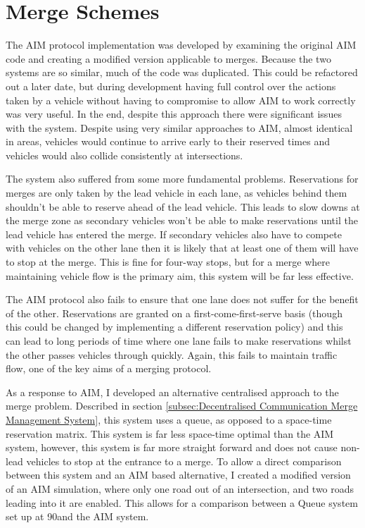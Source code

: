 \section{Merge Schemes}
\label{sec:Merge Schemes}
The AIM protocol implementation was developed by examining the original AIM code and creating a modified version applicable to merges. Because the two systems are so similar, much of the code was duplicated. This could be refactored out a later date, but during development having full control over the actions taken by a vehicle without having to compromise to allow AIM to work correctly was very useful. In the end, despite this approach there were significant issues with the system. Despite using very similar approaches to AIM, almost identical in areas, vehicles would continue to arrive early to their reserved times and vehicles would also collide consistently at intersections.

The system also suffered from some more fundamental problems. Reservations for merges are only taken by the lead vehicle in each lane, as vehicles behind them shouldn't be able to reserve ahead of the lead vehicle. This leads to slow downs at the merge zone as secondary vehicles won't be able to make reservations until the lead vehicle has entered the merge. If secondary vehicles also have to compete with vehicles on the other lane then it is likely that at least one of them will have to stop at the merge. This is fine for four-way stops, but for a merge where maintaining vehicle flow is the primary aim, this system will be far less effective.

The AIM protocol also fails to ensure that one lane does not suffer for the benefit of the other. Reservations are granted on a first-come-first-serve basis (though this could be changed by implementing a different reservation policy) and this can lead to long periods of time where one lane fails to make reservations whilst the other passes vehicles through quickly. Again, this fails to maintain traffic flow, one of the key aims of a merging protocol.

As a response to AIM, I developed an alternative centralised approach to the merge problem. Described in section \ref{subsec:Decentralised Communication Merge Management System}, this system uses a queue, as opposed to a space-time reservation matrix. This system is far less space-time optimal than the AIM system, however, this system is far more straight forward and does not cause non-lead vehicles to stop at the entrance to a merge. To allow a direct comparison between this system and an AIM based alternative, I created a modified version of an AIM simulation, where only one road out of an intersection, and two roads leading into it are enabled. This allows for a comparison between a Queue system set up at 90\degree and the AIM system.

